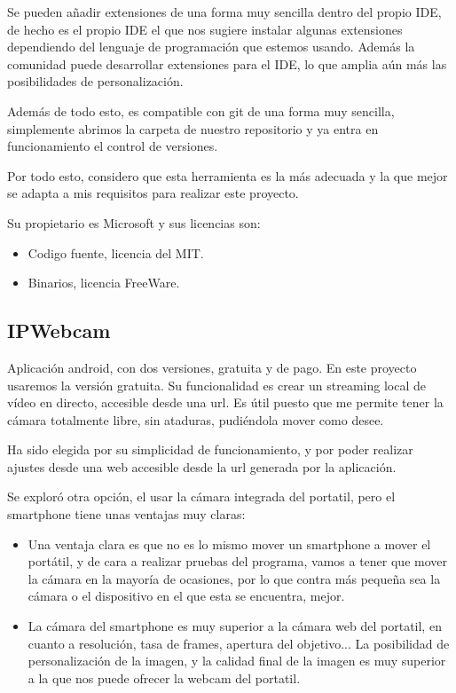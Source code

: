 Se pueden añadir extensiones de una forma muy sencilla dentro del propio IDE, de hecho es el propio IDE el que nos sugiere instalar algunas extensiones dependiendo del lenguaje de programación que estemos usando. Además la comunidad puede desarrollar extensiones para el IDE, lo que amplia aún más las posibilidades de personalización.

Además de todo esto, es compatible con git de una forma muy sencilla, simplemente abrimos la carpeta de nuestro repositorio y ya entra en funcionamiento el control de versiones.

Por todo esto, considero que esta herramienta es la más adecuada y la que mejor se adapta a mis requisitos para realizar este proyecto.

Su propietario es Microsoft y sus licencias son:
\begin{itemize}
	\item Codigo fuente, licencia del MIT.
	\item Binarios, licencia FreeWare.
\end{itemize}

\subsection{IPWebcam}
Aplicación android, con dos versiones, gratuita y de pago. En este proyecto usaremos la versión gratuita.
Su funcionalidad es crear un streaming local de vídeo en directo, accesible desde una url. Es útil puesto que me permite tener la cámara totalmente libre, sin ataduras, pudiéndola mover como desee.

Ha sido elegida por su simplicidad de funcionamiento, y por poder realizar ajustes desde una web accesible desde la url generada por la aplicación.

Se exploró otra opción, el usar la cámara integrada del portatil, pero el smartphone tiene unas ventajas muy claras:

\begin{itemize}
	
	\item Una ventaja clara es que no es lo mismo mover un smartphone a mover el portátil, y de cara a realizar pruebas del programa, vamos a tener que mover la cámara en la mayoría de ocasiones, por lo que contra más pequeña sea la cámara o el dispositivo en el que esta se encuentra, mejor.
	
	\item La cámara del smartphone es muy superior a la cámara web del portatil, en cuanto a resolución, tasa de frames, apertura del objetivo... La posibilidad de personalización de la imagen, y la calidad final de la imagen es muy superior a la que nos puede ofrecer la webcam del portatil.
	
\end{itemize}

